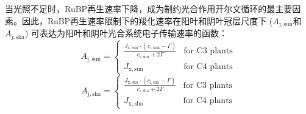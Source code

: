 当光照不足时，RuBP再生速率下降，成为制约光合作用开尔文循环的最主要因素。因此，RuBP再生速率限制下的羧化速率在阳叶和阴叶冠层尺度下 ($A_{\mathrm{j,sun}}$和$A_{\mathrm{j,sha}}$) 可表达为阳叶和阴叶光合系统电子传输速率的函数：
\begin{equation}\label{A_J1sun}
A_{\mathrm{j,sun}}=\begin{cases}\frac{J_{\mathrm{x,sun}}\cdot\left(c_{\mathrm{i,sun}}-\Gamma\right)}{c_{\mathrm{i,sun}}+2\Gamma}
     & \text{for C3 plants} \\
J_{\mathrm{x,sun}} & \text{for C4 plants}
\end{cases}
\end{equation}
\begin{equation}\label{A_J1sha}
A_{\mathrm{j,sha}}=\begin{cases}\frac{J_{\mathrm{x,sha}}\cdot\left(c_{\mathrm{i,sha}}-\Gamma\right)}{c_{\mathrm{i,sha}}+2\Gamma}
     & \text{for C3 plants} \\
J_{\mathrm{x,sha}} & \text{for C4 plants}
\end{cases}
\end{equation}

